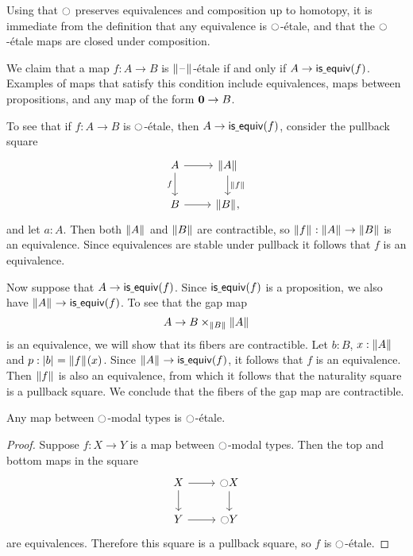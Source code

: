 \documentclass[9pt,twosided]{amsart}
\begin{document}
Using that ${\ocircle}$ preserves equivalences and composition up to homotopy,
it is immediate from the definition that any equivalence is ${\ocircle}$-\'etale, and that the ${\ocircle}$-\'etale maps are closed under composition.

\begin{eg}\label{eg:etale_prop}
We claim that a map $f:A\to B$ is $\brck{\blank}$-\'etale if and only if $A\to \mathsf{is\underline{\ }{}equiv}(f)$. Examples of maps that satisfy this condition include equivalences, maps between propositions, and any map of the form $\mathbf{0}\to B$.

To see that if $f:A\to B$ is ${\ocircle}$-\'etale, then $A\to\mathsf{is\underline{\ }{}equiv}(f)$, consider the pullback square
\begin{equation*}
\begin{tikzcd}
A \arrow[r] \arrow[d,swap,"f"] & \brck{A} \arrow[d,"\brck{f}"] \\
B \arrow[r] & \brck{B},
\end{tikzcd}
\end{equation*}
and let $a:A$. Then both $\brck{A}$ and $\brck{B}$ are contractible, so $\brck{f}:\brck{A}\to\brck{B}$ is an equivalence. Since equivalences are stable under pullback it follows that $f$ is an equivalence.

Now suppose that $A\to \mathsf{is\underline{\ }{}equiv}(f)$. Since $\mathsf{is\underline{\ }{}equiv}(f)$ is a proposition, we also have $\brck{A}\to\isequiv(f)$. To see that the gap map
\begin{equation*}
A \to B\times_{\brck{B}}\brck{A}
\end{equation*}
is an equivalence, we will show that its fibers are contractible. Let $b:B$, $x:\brck{A}$ and $p:\bproj{b}=\brck{f}(x)$. Since $\brck{A}\to\isequiv(f)$, it follows that $f$ is an equivalence. Then $\brck{f}$ is also an equivalence, from which it follows that the naturality square is a pullback square. We conclude that the fibers of the gap map are contractible. 
\end{eg}

\begin{lem}\label{lem:etale_modal}
Any map between ${\ocircle}$-modal types is ${\ocircle}$-\'etale.
\end{lem}

\begin{proof}
Suppose $f:X\to Y$ is a map between ${\ocircle}$-modal types. Then the top and bottom maps in the square
\begin{equation*}
\begin{tikzcd}
X \arrow[r] \arrow[d] & \modal X \arrow[d] \\
Y \arrow[r] & \modal Y
\end{tikzcd}
\end{equation*}
are equivalences. Therefore this square is a pullback square, so $f$ is ${\ocircle}$-\'etale.
\end{proof}
\end{document}
